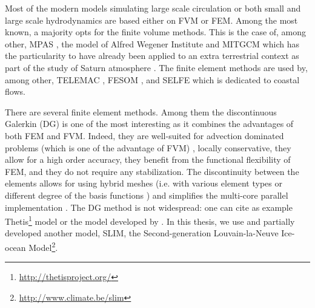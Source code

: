 Most of the modern models simulating large scale circulation or both small and large scale hydrodynamics are based either on FVM or FEM. Among the most known, a majority opts for the finite volume methods. This is the case of, among other, MPAS \citep[Model for Precision Across Scales\footnote{\url{https://mpas-dev.github.io}}][]{ringler2013multi}, the model of Alfred Wegener Institute \citep{danilov2012two} and MITGCM \citep[MIT General Circulation Model\footnote{\url{http://mitgcm.org}}][]{marshall1997finite} which has the particularity to have already been applied to an extra terrestrial context as part of the study of Saturn atmosphere \citep{afanasyev2018cyclonic}. The finite element methods are used by, among other, TELEMAC \citep[open TELEMAC-MASCARET\footnote{\url{http://www.opentelemac.org}}][]{hervouet2007hydrodynamics}, FESOM \citep[Finite Element Sea Ice-Ocean Model\footnote{\url{https://fesom.de}}][]{wang2008finite}, and SELFE \citep[Semi-implicit Eulerian-Lagrangian Finite Element\footnote{\url{http://www.stccmop.org/knowledge_transfer/software/selfe}}][]{zhang2008selfe} which is dedicated to coastal flows.

There are several finite element methods. Among them the discontinuous Galerkin (DG) is one of the most interesting as it combines the advantages of both FEM and FVM. Indeed, they are well-suited for advection dominated problems (which is one of the advantage of FVM) \citep{bernard2007high}, locally conservative, they allow for a high order accuracy, they benefit from the functional flexibility of FEM, and they do not require any stabilization. The discontinuity between the elements allows for using hybrid meshes (i.e. with various element types or different degree of the basis functions \citep{karna2012Thesis}) and simplifies the multi-core parallel implementation \citep{seny2013multirate,seny2014efficient}. The DG method is not widespread: one can cite as example Thetis\footnote{\url{http://thetisproject.org/}} model \citep{karna2018thetis} or the model developed by \citet{conroy2016hp}. In this thesis, we use and partially developed another model, SLIM, the Second-generation Louvain-la-Neuve Ice-ocean Model\footnote{\url{http://www.climate.be/slim}}.

